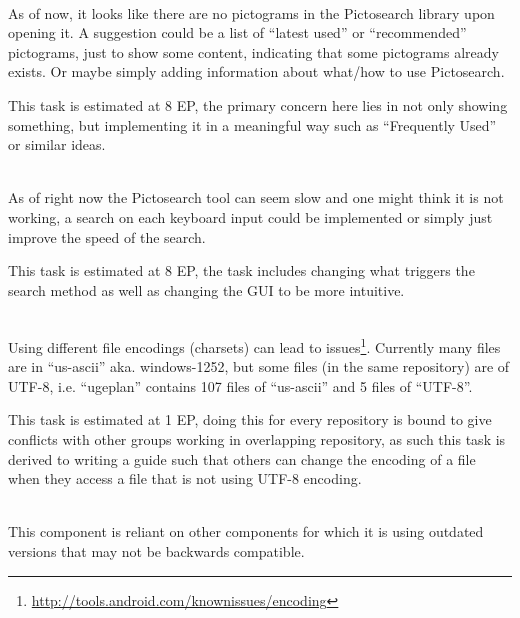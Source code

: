 \begin{description}[style=unboxed]
    \item[{[}\phigh{]} Pictosearch --- It looks like there are no pictograms, until you search for them] \hfill \\
        As of now, it looks like there are no pictograms in the Pictosearch library upon opening it.
        A suggestion could be a list of \enquote{latest used} or \enquote{recommended} pictograms, just to show some content, indicating that some pictograms already exists.
        Or maybe simply adding information about what/how to use Pictosearch.

        This task is estimated at 8 EP, the primary concern here lies in not only showing something, but implementing it in a meaningful way such as \enquote{Frequently Used} or similar ideas.
    \item[{[}\phigh{]} Pictosearch --- Responsive Search] \hfill \\
        As of right now the Pictosearch tool can seem slow and one might think it is not working, a search on each keyboard input could be implemented or simply just improve the speed of the search.

        This task is estimated at 8 EP, the task includes changing what triggers the search method as well as changing the GUI to be more intuitive.
    \item[{[}\phigh{]} General --- Use consistent file encoding] \hfill \\
        Using different file encodings (charsets) can lead to issues\footnote{\url{http://tools.android.com/knownissues/encoding}}.
        Currently many files are in \enquote{us-ascii} aka. windows-1252, but some files (in the same repository) are of UTF-8, i.e. \enquote{ugeplan} contains 107 files of \enquote{us-ascii} and 5 files of \enquote{UTF-8}.

        This task is estimated at 1 EP, doing this for every repository is bound to give conflicts with other groups working in overlapping repository, as such this task is derived to writing a guide such that others can change the encoding of a file when they access a file that is not using UTF-8 encoding.
    \item[{[}\phigh{]} SequenceViewer --- Update dependencies] \hfill \\
        This component is reliant on other components for which it is using outdated versions that may not be backwards compatible.


\end{description}
